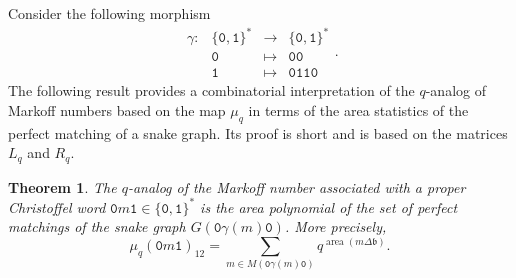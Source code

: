 \documentclass[a4paper,12pt]{amsart}
\newtheorem{theorem}[definition]{Theorem}
\newcommand{\bfrak}{{\mathfrak{b}}}
\newcommand{\0}{\mathtt{0}}
\newcommand{\1}{\mathtt{1}}
\newcommand{\2}{\mathtt{2}}
\newcommand{\3}{\mathtt{3}}
\DeclareMathOperator{\area}{area}
\begin{document}
Consider the following morphism
    \[
    \begin{array}{rccl}
        \gamma:&\{\0,\1\}^*&\to& \{\0,\1\}^*\\
        &\0&\mapsto &\0\0\\
        &\1&\mapsto &\0\1\1\0
    \end{array}.
    \]
The following result provides a
combinatorial interpretation of the $q$-analog of Markoff numbers
based on the map $\mu_q$ in terms of the area statistics of the perfect
matching of a snake graph. Its proof is short and is based on the matrices
$L_q$ and $R_q$.

\begin{theorem}\label{thm:we-recover-the-q-analog-of-Markoff-number}
    The $q$-analog of the Markoff number associated with a proper Christoffel
    word $\0 m\1\in\{\0,\1\}^*$ is
    the area polynomial of the set of perfect matchings
    of the snake graph $G(\0\gamma(m)\0)$.
    More precisely,
    \[
        \mu_q(\0m\1)_{12}
        =
        \sum_{m\in M(\0\gamma(m)\0)} q^{\area(m\Delta\bfrak)}.
    \]
\end{theorem}
\end{document}
